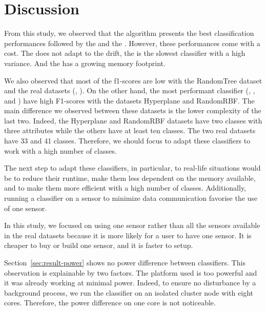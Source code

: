 \section{Discussion}

From this study, we observed that the \hoeffdingtree algorithm presents the
best classification performances followed by the \naivebayes and the \mondrianforest.  However, these performances come with a cost.  The \naivebayes does
not adapt to the drift, the \mondrianforest is the slowest classifier with a
high variance. And the \hoeffdingtree has a growing memory footprint.

We also observed that most of the f1-scores are low with the RandomTree dataset and
the real datasets (\banosdataset, \recofitdataset). On the other hand, the most
performant classifier (\mondrianforest, \hoeffdingtree, and \naivebayes) have high
F1-scores with the datasets Hyperplane and RandomRBF. The main difference we
observed between these datasets is the lower complexity of the last two.
Indeed, the Hyperplane and RandomRBF datasets have two classes with three
attributes while the others have at least ten classes. The two real datasets
have 33 and 41 classes. Therefore, we should focus to adapt these classifiers
to work with a high number of classes.

The next step to adapt these classifiers, \mondrianforest in particular, to real-life
situations would be to reduce their runtime, make them less dependent on the
memory available, and to make them more efficient with a high number of
classes. Additionally, running a classifier on a sensor to minimize data
communication favorise the use of one sensor.


In this study, we focused on using one sensor rather than all the sensors
available in the real datasets because it is more likely for a user to have one
sensor. It is cheaper to buy or build one sensor, and it is faster to setup.


Section~\ref{sec:result-power} shows no power difference between classifiers. This
observation is explainable by two factors. The platform used is too powerful
and it was already working at minimal power. Indeed, to ensure no disturbance
by a background process, we run the classifier on an isolated cluster node with
eight cores. Therefore, the power difference on one core is not noticeable.

